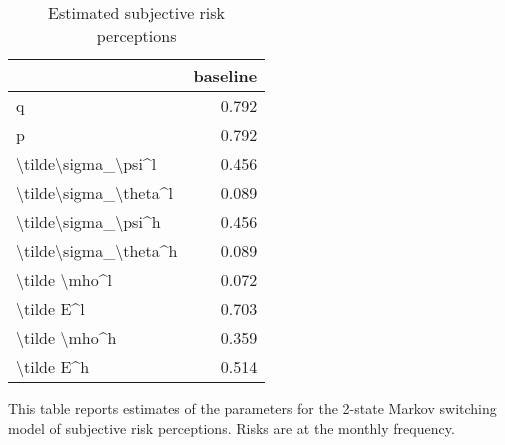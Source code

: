 
\begin{table}[p]
\centering
\begin{adjustbox}{width=0.3\textwidth}
\begin{threeparttable}
\caption{Estimated subjective risk perceptions}
\label{tab:PRMarkovEst}\begin{tabular}{lr}
\toprule
{} &  baseline \\
\midrule
q                     &     0.792 \\
p                     &     0.792 \\
\textbackslash tilde\textbackslash sigma\_\textbackslash psi\textasciicircum l   &     0.456 \\
\textbackslash tilde\textbackslash sigma\_\textbackslash theta\textasciicircum l &     0.089 \\
\textbackslash tilde\textbackslash sigma\_\textbackslash psi\textasciicircum h   &     0.456 \\
\textbackslash tilde\textbackslash sigma\_\textbackslash theta\textasciicircum h &     0.089 \\
\textbackslash tilde \textbackslash mho\textasciicircum l         &     0.072 \\
\textbackslash tilde E\textasciicircum l            &     0.703 \\
\textbackslash tilde \textbackslash mho\textasciicircum h         &     0.359 \\
\textbackslash tilde E\textasciicircum h            &     0.514 \\
\bottomrule
\end{tabular}
\begin{tablenotes}\item This table reports estimates of the parameters 
for the 2-state Markov switching model of subjective risk perceptions. Risks are at the monthly frequency. 
\end{tablenotes}
\end{threeparttable}
\end{adjustbox}
\end{table}